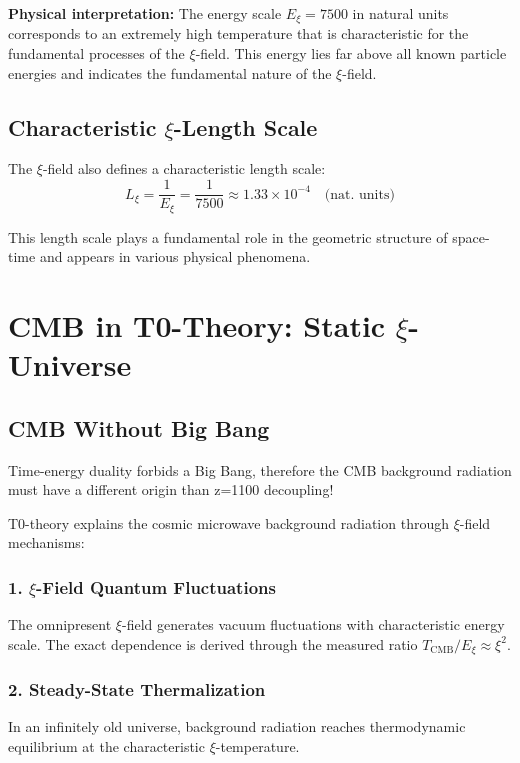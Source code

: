 \documentclass[12pt,a4paper]{report}
\begin{document}
	\textbf{Physical interpretation:} The energy scale $E_\xi = 7500$ in natural units corresponds to an extremely high temperature that is characteristic for the fundamental processes of the $\xi$-field. This energy lies far above all known particle energies and indicates the fundamental nature of the $\xi$-field.
	
	\subsection{Characteristic $\xi$-Length Scale}
	
	The $\xi$-field also defines a characteristic length scale:
	\begin{equation}
		L_\xi = \frac{1}{E_\xi} = \frac{1}{7500} \approx 1.33 \times 10^{-4} \quad \text{(nat. units)}
	\end{equation}
	
	This length scale plays a fundamental role in the geometric structure of space-time and appears in various physical phenomena.
	
	\section{CMB in T0-Theory: Static $\xi$-Universe}
	
	\subsection{CMB Without Big Bang}
	
	\begin{revolutionary}
		Time-energy duality forbids a Big Bang, therefore the CMB background radiation must have a different origin than z=1100 decoupling!
	\end{revolutionary}
	
	T0-theory explains the cosmic microwave background radiation through $\xi$-field mechanisms:
	
	\subsubsection{1. $\xi$-Field Quantum Fluctuations}
	The omnipresent $\xi$-field generates vacuum fluctuations with characteristic energy scale. The exact dependence is derived through the measured ratio $T_{\text{CMB}}/E_\xi \approx \xi^2$.
	
	\subsubsection{2. Steady-State Thermalization}
	In an infinitely old universe, background radiation reaches thermodynamic equilibrium at the characteristic $\xi$-temperature.
	
\end{document}
